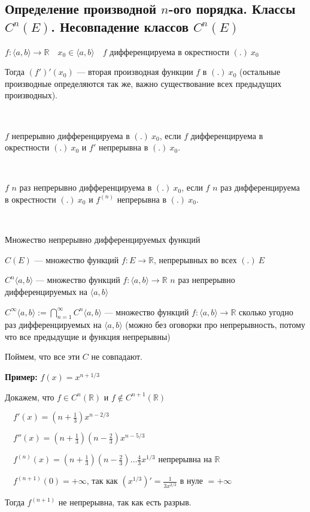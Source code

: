 \subsection{Определение производной $n$-ого порядка. Классы $C^n(E)$. Несовпадение классов $C^n(E)$ \href{https://youtu.be/au9-34CerJM?t=1866}{\Walley}}

\begin{conj} 
    $f: \langle a, b \rangle \rightarrow \mathbb{R} \quad x_0 \in \langle a, b \rangle \quad f$ дифференцируема в окрестности $(.) \ x_0$

    Тогда $(f')'(x_0)$ --- вторая производная функции $f$ в $(.) \ x_0$ (остальные производные определяются так же, важно существование всех предыдущих производных).
\end{conj}
\
\begin{conj}
    $f$ непрерывно дифференцируема в $(.) \ x_0$, если $f$ дифференцируема в окрестности $(.) \ x_0$ и $f'$ непрерывна в $(.) \ x_0$.
\end{conj}
\
\begin{conj}
    $f$ $n$ раз непрерывно дифференцируема в $(.) \ x_0$, если $f$ $n$ раз дифференцируема в окрестности $(.) \ x_0$ и $f^{(n)}$ непрерывна в $(.) \ x_0$.
\end{conj}
\
\begin{conj}
    Множество непрерывно дифференцируемых функций

    $C(E)$ --- множество функций $f: E \rightarrow \mathbb{R}$, непрерывных во всех $(.) \ E$

    $C^n \langle a, b \rangle$ --- множество функций $f: \langle a, b \rangle \rightarrow \mathbb{R}$ $n$ раз непрерывно дифференцируемых на $\langle a, b \rangle$

    $C^\infty \langle a, b \rangle := \bigcap\limits_{n=1}^{\infty} C^n \langle a, b \rangle$ --- множество функций $f: \langle a, b \rangle \rightarrow \mathbb{R}$ сколько угодно раз дифференцируемых на $\langle a, b \rangle$ (можно без оговорки про непрерывность, потому что все предыдущие и функция непрерывны)
\end{conj}

Поймем, что все эти $C$ не совпадают.
\par\medskip
\textbf{Пример:} $f(x) = x^{n+1/3}$

Докажем, что $f \in C^n(\mathbb{R})$ и $f \notin C^{n+1}(\mathbb{R})$

$\quad f'(x) = (n + \frac{1}{3})x^{n-2/3}$

$\quad f''(x) = (n + \frac{1}{3})(n - \frac{2}{3})x^{n-5/3}$

$\quad f^{(n)}(x) = (n + \frac{1}{3})(n - \frac{2}{3}) \dots \frac{4}{3} x^{1/3}$ непрерывна на $\mathbb{R}$

$\quad f^{(n+1)}(0) = +\infty $, так как $(x^{1/3})' = \frac{1}{3x^{2/3}}$ в нуле $= +\infty$

Тогда $f^{(n+1)}$ не непрерывна, так как есть разрыв.


